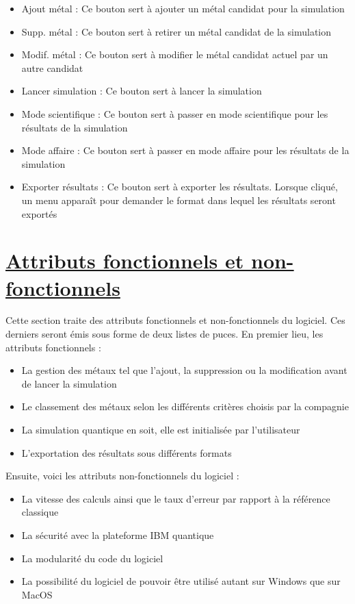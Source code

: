 \documentclass[11pt]{article}
\begin{document}
\begin{itemize}
  \item Ajout métal : Ce bouton sert à ajouter un métal candidat pour la simulation
  \item Supp. métal : Ce bouton sert à retirer un métal candidat de la simulation
  \item Modif. métal : Ce bouton sert à modifier le métal candidat actuel par un autre candidat
  \item Lancer simulation : Ce bouton sert à lancer la simulation
  \item Mode scientifique : Ce bouton sert à passer en mode scientifique pour les résultats de la simulation
  \item Mode affaire : Ce bouton sert à passer en mode affaire pour les résultats de la simulation
  \item Exporter résultats : Ce bouton sert à exporter les résultats. Lorsque cliqué, un menu apparaît pour demander le format dans lequel les résultats seront exportés
\end{itemize}
\pagebreak


\section{\underline{Attributs fonctionnels et non-fonctionnels}}
Cette section traite des attributs fonctionnels et non-fonctionnels du logiciel. Ces derniers seront émis sous forme de deux listes de puces. En premier lieu, les attributs fonctionnels :

\begin{itemize}
  \item La gestion des métaux tel que l'ajout, la suppression ou la modification avant de lancer la simulation
  \item Le classement des métaux selon les différents critères choisis par la compagnie
  \item La simulation quantique en soit, elle est initialisée par l'utilisateur
  \item L'exportation des résultats sous différents formats
\end{itemize}
Ensuite, voici les attributs non-fonctionnels du logiciel :

\begin{itemize}
  \item La vitesse des calculs ainsi que le taux d'erreur par rapport à la référence classique
  \item La sécurité avec la plateforme IBM quantique
  \item La modularité du code du logiciel
  \item La possibilité du logiciel de pouvoir être utilisé autant sur Windows que sur MacOS
\end{itemize}
\end{document}
